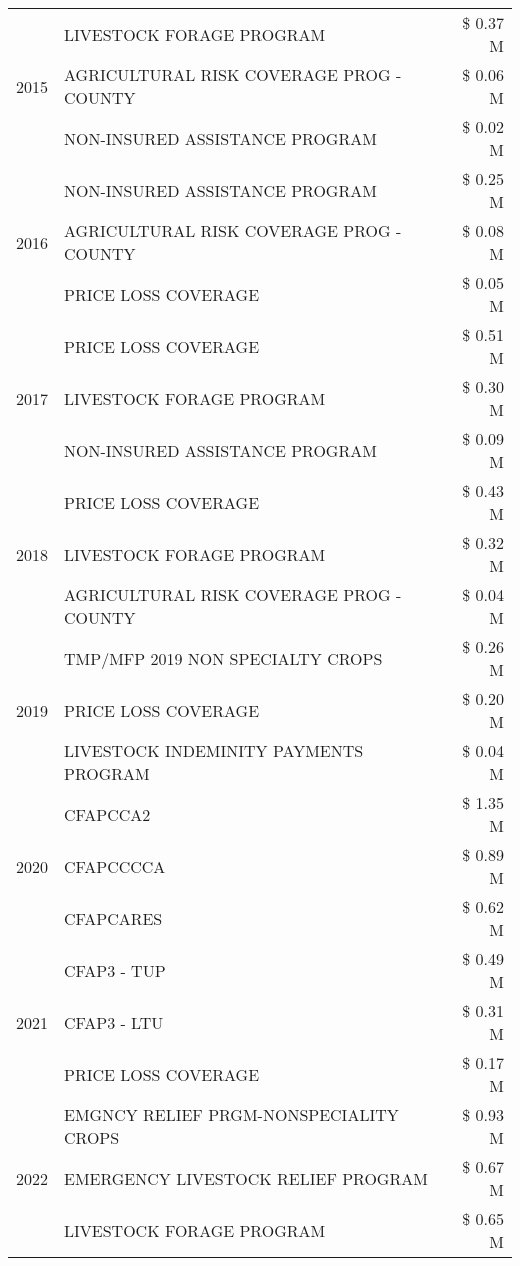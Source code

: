 \begin{tabular}{llr}
\multirow[t]{3}{*}{2015} & LIVESTOCK FORAGE PROGRAM & \$ 0.37 M \\
 & AGRICULTURAL RISK COVERAGE PROG - COUNTY & \$ 0.06 M \\
 & NON-INSURED ASSISTANCE PROGRAM & \$ 0.02 M \\
\cline{1-3}
\multirow[t]{3}{*}{2016} & NON-INSURED ASSISTANCE PROGRAM & \$ 0.25 M \\
 & AGRICULTURAL RISK COVERAGE PROG - COUNTY & \$ 0.08 M \\
 & PRICE LOSS COVERAGE & \$ 0.05 M \\
\cline{1-3}
\multirow[t]{3}{*}{2017} & PRICE LOSS COVERAGE & \$ 0.51 M \\
 & LIVESTOCK FORAGE PROGRAM & \$ 0.30 M \\
 & NON-INSURED ASSISTANCE PROGRAM & \$ 0.09 M \\
\cline{1-3}
\multirow[t]{3}{*}{2018} & PRICE LOSS COVERAGE & \$ 0.43 M \\
 & LIVESTOCK FORAGE PROGRAM & \$ 0.32 M \\
 & AGRICULTURAL RISK COVERAGE PROG - COUNTY & \$ 0.04 M \\
\cline{1-3}
\multirow[t]{3}{*}{2019} & TMP/MFP 2019 NON SPECIALTY CROPS & \$ 0.26 M \\
 & PRICE LOSS COVERAGE & \$ 0.20 M \\
 & LIVESTOCK INDEMINITY PAYMENTS PROGRAM & \$ 0.04 M \\
\cline{1-3}
\multirow[t]{3}{*}{2020} & CFAPCCA2 & \$ 1.35 M \\
 & CFAPCCCCA & \$ 0.89 M \\
 & CFAPCARES & \$ 0.62 M \\
\cline{1-3}
\multirow[t]{3}{*}{2021} & CFAP3 - TUP & \$ 0.49 M \\
 & CFAP3 - LTU & \$ 0.31 M \\
 & PRICE LOSS COVERAGE & \$ 0.17 M \\
\cline{1-3}
\multirow[t]{3}{*}{2022} & EMGNCY RELIEF PRGM-NONSPECIALITY CROPS & \$ 0.93 M \\
 & EMERGENCY LIVESTOCK RELIEF PROGRAM & \$ 0.67 M \\
 & LIVESTOCK FORAGE PROGRAM & \$ 0.65 M \\
\cline{1-3}
\bottomrule
\end{tabular}
